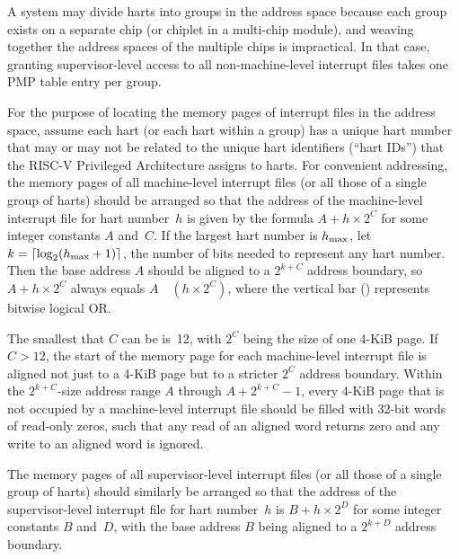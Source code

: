 \begin{commentary}
A system may divide harts into groups in the address space because each
group exists on a separate chip (or chiplet in a multi-chip module),
and weaving together the address spaces of the multiple chips is
impractical.
In that case, granting supervisor-level access to all non-machine-level
interrupt files takes one PMP table entry per group.
\end{commentary}

For the purpose of locating the memory pages of interrupt files in the
address space, assume each hart (or each hart within a group) has a
unique hart number that may or may not be related to the unique hart
identifiers (``hart IDs'') that the RISC-V Privileged Architecture
assigns to harts.
For convenient addressing, the memory pages of all machine-level
interrupt files (or all those of a single group of harts) should be
arranged so that the address of the machine-level interrupt file for
hart number~$h$ is given by the formula ${A+h\times\mbox{2}^{C}}$ for
some integer constants $A$ and~$C$.
If the largest hart number is $h_{\rm max}$, let
${k = \lceil\log_{2}(h_{\rm max}+\mbox{1})\rceil}$, the number of bits
needed to represent any hart number.
Then the base address $A$ should be aligned to a $\mbox{2}^{k+C}$
address boundary, so ${A+h\times\mbox{2}^{C}}$ always equals
$A$~\z{|}~${(h\times\mbox{2}^{C})}$, where the vertical bar (\z{|})
represents bitwise logical OR.

The smallest that $C$ can be is~12, with $\mbox{2}^{C}$ being the size
of one \mbox{4-KiB} page.
If ${C > 12}$, the start of the memory page for each machine-level
interrupt file is aligned not just to a \mbox{4-KiB} page but to a
stricter $\mbox{2}^{C}$ address boundary.
Within the ${\mbox{2}^{k+C}}$-size address range $A$ through
${A+\mbox{2}^{k+C}-\mbox{1}}$, every \mbox{4-KiB} page that is not
occupied by a machine-level interrupt file should be filled with
\mbox{32-bit} words of read-only zeros, such that any read of an
aligned word returns zero and any write to an aligned word is ignored.

The memory pages of all supervisor-level interrupt files (or all those
of a single group of harts) should similarly be arranged so that the
address of the supervisor-level interrupt file for hart number~$h$
is ${B+h\times\mbox{2}^{D}}$ for some integer constants $B$ and~$D$,
with the base address $B$ being aligned to a $\mbox{2}^{k+D}$ address
boundary.

